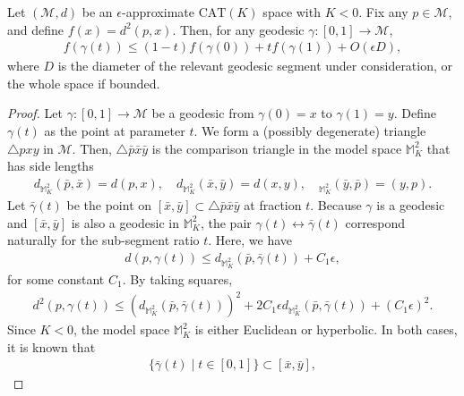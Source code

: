 \begin{theorem}
\label{thm:approximate_geodesic_convexity_of_squared_distance}
    Let $(\mathcal{M}, d)$ be an $\epsilon$-approximate $\mathrm{CAT}(K)$ space with $K < 0$.
    Fix any $p \in \mathcal{M}$, and define $f(x) = d^2(p, x)$.
    Then, for any geodesic $\gamma \colon [0, 1] \to \mathcal{M}$,
    \begin{align}
        f(\gamma(t)) \leq (1 - t) f(\gamma(0)) + t f(\gamma(1)) + O(\epsilon D),
    \end{align}
    where $D$ is the diameter of the relevant geodesic segment under consideration, or the whole space if bounded.
\end{theorem}
\begin{proof}
    Let $\gamma \colon [0, 1] \to \mathcal{M}$ be a geodesic from $\gamma(0) = x$ to $\gamma(1) = y$.
    Define $\gamma(t)$ as the point at parameter $t$.
    We form a (possibly degenerate) triangle $\triangle pxy$ in $\mathcal{M}$.
    Then, $\triangle \bar{p}\bar{x}\bar{y}$ is the comparison triangle in the model space $\mathbb{M}_K^2$ that has side lengths
    \begin{align*}
        d_{\mathbb{M}_K^2}(\bar{p}, \bar{x}) = d(p, x), \quad d_{\mathbb{M}^2_K}(\bar{x}, \bar{y}) = d(x, y), \quad _{\mathbb{M}_K^2}(\bar{y}, \bar{p}) = (y, p).
    \end{align*}
    Let $\bar{\gamma}(t)$ be the point on $[\bar{x}, \bar{y}] \subset \triangle \bar{p}\bar{x}\bar{y}$ at fraction $t$.
    Because $\gamma$ is a geodesic and $[\bar{x}, \bar{y}]$ is also a geodesic in $\mathbb{M}_K^2$, the pair $\gamma(t) \leftrightarrow \bar{\gamma}(t)$ correspond naturally for the sub-segment ratio $t$.
    Here, we have
    \begin{align*}
        d(p, \gamma(t)) \leq d_{\mathbb{M}_K^2}(\bar{p}, \bar{\gamma}(t)) + C_1\epsilon,
    \end{align*}
    for some constant $C_1$.
    By taking squares,
    \begin{align*}
        d^2(p, \gamma(t)) \leq \left(d_{\mathbb{M}_K^2}(\bar{p}, \bar{\gamma}(t))\right)^2 + 2C_1 \epsilon d_{\mathbb{M}_K^2}(\bar{p}, \bar{\gamma}(t)) + (C_1\epsilon)^2.
    \end{align*}
    Since $K < 0$, the model space $\mathbb{M}_K^2$ is either Euclidean or hyperbolic.
    In both cases, it is known that
    \begin{align*}
        \{\bar{\gamma}(t) \mid t \in [0, 1] \} \subset [\bar{x}, \bar{y}],

\end{align*}
\end{proof}
